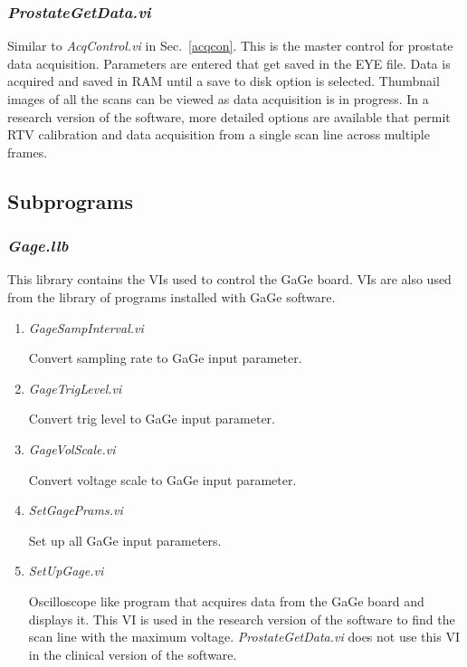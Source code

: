 \documentclass[10pt]{article}
\begin{document}
\subsubsection{{\it ProstateGetData.vi}}

Similar to {\it AcqControl.vi} in Sec.~\ref{acqcon}. This is the
master control for prostate data acquisition. Parameters are
entered that get saved in the EYE file. Data is acquired and saved
in RAM until a save to disk option is selected. Thumbnail images
of all the scans can be viewed as data acquisition is in progress.
In a research version of the software, more detailed options are
available that permit RTV calibration and data acquisition from a
single scan line across multiple frames.


\subsection{Subprograms}
\subsubsection{{\it Gage.llb}}
This library contains the VIs used to control the GaGe board. VIs
are also used from the library of programs installed with GaGe
software.

\begin{enumerate}

\item {\it GageSampInterval.vi}

Convert sampling rate to GaGe input parameter.

\item {\it GageTrigLevel.vi}

Convert trig level to GaGe input parameter.

\item {\it GageVolScale.vi}

Convert voltage scale to GaGe input parameter.

\item {\it SetGagePrams.vi}

Set up all GaGe input parameters.

\item {\it SetUpGage.vi}

Oscilloscope like program that acquires data from the GaGe board
and displays it. This VI is used in the research version of the
software to find the scan line with the maximum voltage. {\it
ProstateGetData.vi} does not use this VI in the clinical version
of the software.

\end{enumerate}
\end{document}
